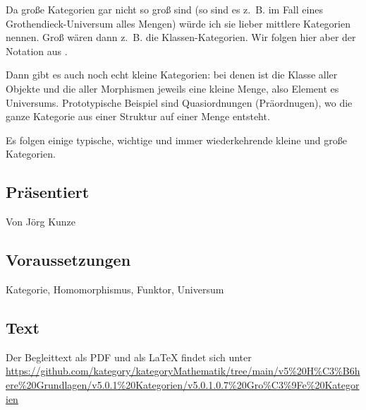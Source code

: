 \documentclass[a4paper]{amsart}
\theoremstyle{definition}
\newcommand{\zb}{z.~B. }
\begin{document}
Da große Kategorien gar nicht so groß sind (so sind es \zb im Fall eines Grothendieck-Universum alles Mengen) würde ich sie lieber mittlere Kategorien nennen. Groß wären dann \zb die Klassen-Kategorien. Wir folgen hier aber der Notation aus \cite{MacLane}.

Dann gibt es auch noch echt kleine Kategorien: bei denen ist die Klasse aller Objekte und die aller Morphismen jeweils eine kleine Menge, also Element es Universums. Prototypische Beispiel sind Quasiordnungen (Präordnugen), wo die ganze Kategorie aus einer Struktur auf einer Menge entsteht.

Es folgen einige typische, wichtige und immer wiederkehrende kleine und große Kategorien.

\subsection*{Präsentiert}
Von Jörg Kunze

\subsection*{Voraussetzungen}
Kategorie, Homomorphismus, Funktor, Universum

\subsection*{Text}
Der Begleittext als PDF und als LaTeX findet sich unter
{\tiny
   \url{https://github.com/kategory/kategoryMathematik/tree/main/v5%20H%C3%B6here%20Grundlagen/v5.0.1%20Kategorien/v5.0.1.0.7%20Gro%C3%9Fe%20Kategorien}
}

\end{document}
